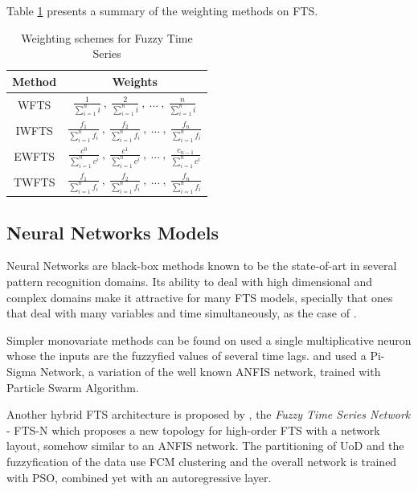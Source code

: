 Table \ref{tab:wfts} presents a summary of the weighting methods on FTS.

\begin{table}[htb]
\begin{center}
\begin{tabular}{|c|c|}  \hline
\textbf{Method} & \textbf{Weights} \\ \hline
WFTS & $\frac{1}{\sum_{i = 1}^n i}\ ,\ \frac{2}{\sum_{i = 1}^n i}\ ,\ ...\ ,\ \frac{n}{\sum_{i = 1}^n i}$ \\ \hline
IWFTS & $\frac{f_1}{\sum_{i = 1}^n f_i}\ ,\ \frac{f_2}{\sum_{i = 1}^n f_i}\ ,\ ...\ ,\ \frac{f_n}{\sum_{i = 1}^n f_i}$ \\ \hline
EWFTS & $\frac{c^0}{\sum_{i = 1}^n c^i}\ ,\ \frac{c^1}{\sum_{i = 1}^n c^i}\ ,\ ...\ ,\ \frac{c_{n-1}}{\sum_{i = 1}^n c^i}$ \\ \hline
TWFTS & $\frac{f_1}{\sum_{i = 1}^n f_i}\ ,\ \frac{f_2}{\sum_{i = 1}^n f_i}\ ,\ ...\ ,\ \frac{f_n}{\sum_{i = 1}^n f_i}$ \\ \hline
\end{tabular}
\end{center}
\caption{Weighting schemes for Fuzzy Time Series}
\label{tab:wfts}
\end{table}

%
\subsection{Neural Networks Models}
\label{sec:fts_neural}

Neural Networks are black-box methods known to be the state-of-art in several pattern recognition domains. Its ability to deal with high dimensional and complex domains make it attractive for many FTS models, specially that ones that deal with many variables and time simultaneously, as the case of \cite{Egrioglu2009}.

Simpler monovariate methods can be found on \cite{Yolcu2017} used a single multiplicative neuron whose the inputs are the fuzzyfied values of several time lags. \cite{Bas2015} and \cite{Bas2018} used a Pi-Sigma Network, a variation of the well known ANFIS network, trained with Particle Swarm Algorithm.

Another hybrid FTS architecture is proposed by \cite{Bas2015}, the \textit{Fuzzy Time Series Network} - FTS-N which proposes a new topology for high-order FTS with a network layout, somehow similar to an ANFIS network. The partitioning of UoD and the fuzzyfication of the data use FCM clustering and the overall network is trained with PSO, combined yet with an autoregressive layer.

